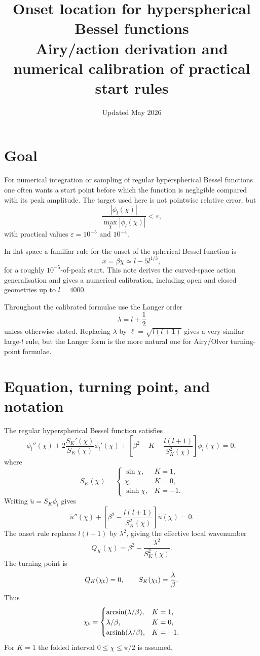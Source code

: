 \documentclass[11pt]{article}
\title{Onset location for hyperspherical Bessel functions\\[3pt]
\large Airy/action derivation and numerical calibration of practical start rules}
\author{}
\date{Updated May 2026}
\newcommand{\SK}{S_K}
\newcommand{\chip}{\chi_{\rm t}}
\newcommand{\lam}{\lambda}
\begin{document}
\maketitle

\section{Goal}

For numerical integration or sampling of regular hyperspherical Bessel functions
one often wants a start point before which the function is negligible compared
with its peak amplitude.  The target used here is not pointwise relative error,
but
\[
  \frac{|\phi_l(\chi)|}{\max_\chi |\phi_l(\chi)|} < \varepsilon,
\]
with practical values \(\varepsilon=10^{-5}\) and \(10^{-4}\).

In flat space a familiar rule for the onset of the spherical Bessel function is
\[
  x=\beta\chi \simeq l-5l^{1/3},
\]
for a roughly \(10^{-5}\)-of-peak start.  This note derives the curved-space
action generalisation and gives a numerical calibration, including open and
closed geometries up to \(l=4000\).

Throughout the calibrated formulae use the Langer order
\[
  \boxed{\lam=l+\frac12}
\]
unless otherwise stated.  Replacing \(\lam\) by
\(\ell=\sqrt{l(l+1)}\) gives a very similar large-\(l\) rule, but the Langer
form is the more natural one for Airy/Olver turning-point formulae.

\section{Equation, turning point, and notation}

The regular hyperspherical Bessel function satisfies
\[
\phi_l''(\chi)
+2\frac{\SK'(\chi)}{\SK(\chi)}\phi_l'(\chi)
+\left[\beta^2-K-\frac{l(l+1)}{\SK^2(\chi)}\right]\phi_l(\chi)=0,
\]
where
\[
\SK(\chi)=
\begin{cases}
\sin\chi, & K=1,\\
\chi, & K=0,\\
\sinh\chi, & K=-1.
\end{cases}
\]
Writing \(\tilde u=\SK\phi_l\) gives
\[
  \tilde u''(\chi)
  +\left[\beta^2-\frac{l(l+1)}{\SK^2(\chi)}\right]\tilde u(\chi)=0.
\]
The onset rule replaces \(l(l+1)\) by \(\lam^2\), giving the effective local
wavenumber
\[
  Q_K(\chi)=\beta^2-\frac{\lam^2}{\SK^2(\chi)}.
\]
The turning point is
\[
  Q_K(\chip)=0,
  \qquad
  \SK(\chip)=\frac{\lam}{\beta}.
\]
Thus
\[
\chip=
\begin{cases}
\arcsin(\lam/\beta), & K=1,\\
\lam/\beta, & K=0,\\
\operatorname{arsinh}(\lam/\beta), & K=-1.
\end{cases}
\]
For \(K=1\) the folded interval \(0\leq\chi\leq\pi/2\) is assumed.
\end{document}
